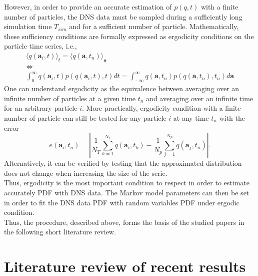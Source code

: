 However, in order to provide an accurate estimation of $p(q,t)$ with a finite number of particles, the DNS data 
must be sampled during a sufficiently long simulation time $T_{sim}$ and for a sufficient number of particle. 
Mathematically, these sufficiency conditions are formally expressed as ergodicity conditions on the particle time series, i.e.,
\begin{equation}
\begin{array}{c}
	\langle q(\textbf{a}_i,t)\rangle_t = \langle q(\textbf{a},t_n)\rangle_{\textbf{a}}\\
	\Leftrightarrow\\
	\int_{0}^{\infty}q(\textbf{a}_i,t) p(q(\textbf{a}_i,t),t)dt=\int_{-\infty}^{\infty}q(\textbf{a},t_n)p(q(\textbf{a},t_n),t_n)d\textbf{a}
\end{array}
\label{eq:ergodicity}
\end{equation}
One can understand ergodicity as the equivalence between averaging over an infinite number of particles at a given time $t_n$ and averaging over an infinite time for an arbitrary particle $i$. 
More practically, ergodicity condition with a finite number of particle can still be tested for any particle $i$ at any time $t_n$ with the error
\begin{equation}\label{eq:ergo_err}
	e(\textbf{a}_i,t_n)=|\frac{1}{N_T}\sum_{k=1}^{N_T}q(\textbf{a}_i,t_k)-\frac{1}{N_p}\sum_{j=1}^{N_p}q(\textbf{a}_j,t_n)|.
\end{equation}
Alternatively, it can be verified by testing that the approximated distribution does not change when increasing the size of the serie.\\
Thus, ergodicity is the most important condition to respect in order to estimate accurately PDF with DNS data. 
The Markov model parameters can then be set in order to fit the DNS data PDF with random variables PDF under ergodic condition.\\
Thus, the procedure, described above, forms the basis of the studied papers in the following short literature review.
\section{Literature review of recent results}
